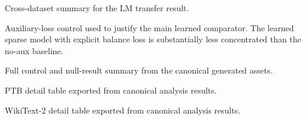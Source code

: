 \documentclass{article}
\begin{document}
\begin{table}[H]
  \centering
  \caption{Cross-dataset summary for the LM transfer result.}
  \small
  
\end{table}

\begin{table}[H]
  \centering
  \caption{Auxiliary-loss control used to justify the main learned comparator. The learned sparse model with explicit balance loss is substantially less concentrated than the no-aux baseline.}
  \small
  
\end{table}

\begin{table}[H]
  \centering
  \caption{Full control and null-result summary from the canonical generated assets.}
  \small
  
\end{table}

\begin{table}[H]
  \centering
  \caption{PTB detail table exported from canonical analysis results.}
  \small
  
\end{table}

\begin{table}[H]
  \centering
  \caption{WikiText-2 detail table exported from canonical analysis results.}
  \small
  
\end{table}
\end{document}
